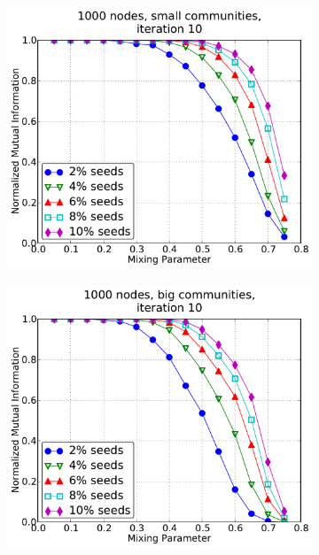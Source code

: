 \begin{figure}[h!]
    \centering
    \begin{subfigure}{0.55\textwidth}
    \centering
    \includegraphics[width=\plotwidth]{plots/nonoverlap_iter_a.pdf}
    \end{subfigure}%
    \begin{subfigure}{0.55\textwidth}
    \centering
    \includegraphics[width=\plotwidth]{plots/nonoverlap_iter_b.pdf}
    \end{subfigure}

\end{figure}
